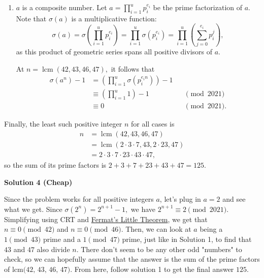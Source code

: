 \begin{enumerate}
\begin{enumerate}
 Together, we conclude that $n=\operatorname{lcm}(42,43,46,47)$ is the least such positive integer $n$ for this case.

 

        \item $a$ is a composite number. Let $a=\prod_{i=1}^{u}p_i^{e_i}$ be the prime factorization of $a.$ Note that $\sigma(a)$ is a multiplicative function: 
 \[\sigma(a)=\sigma\left(\prod_{i=1}^{u}p_i^{e_i}\right)=\prod_{i=1}^{u}\sigma\left(p_i^{e_i}\right)=\prod_{i=1}^{u}\left(\sum_{j=0}^{e_i}p_i^j\right),\] as this product of geometric series spans all positive divisors of $a.$ 

 At $n=\operatorname{lcm}(42,43,46,47),$ it follows that
 \begin{align*} \sigma\left(a^n\right)-1&=\left(\prod_{i=1}^{u}\sigma\left(p_i^{e_in}\right)\right)-1 \\ &\equiv\left(\prod_{i=1}^{u}1\right)-1 &&\pmod{2021} \\ &\equiv0 &&\pmod{2021}. \end{align*}



            \end{enumerate}
            Finally, the least such positive integer $n$ for all cases is
 \begin{align*} n&=\operatorname{lcm}(42,43,46,47) \\ &=\operatorname{lcm}(2\cdot3\cdot7,43,2\cdot23,47) \\ &=2\cdot3\cdot7\cdot23\cdot43\cdot47, \end{align*}
so the sum of its prime factors is $2+3+7+23+43+47=\boxed{125}.$




\textbf{Solution 4 (Cheap)}

Since the problem works for all positive integers $a$, let's plug in $a=2$ and see what we get. Since $\sigma({2^n}) = 2^{n+1}-1,$ we have $2^{n+1} \equiv 2 \pmod{2021}.$ Simplifying using CRT and \href{https://artofproblemsolving.com/wiki/index.php?title=Fermat\%27s\_Little\_Theorem}{Fermat's Little Theorem}, we get that $n \equiv 0 \pmod{42}$ and $n \equiv 0 \pmod{46}.$ Then, we can look at $a$ being a $1\pmod{43}$ prime and a $1\pmod{47}$ prime, just like in Solution 1, to find that $43$ and $47$ also divide $n$. There don't seem to be any other odd "numbers" to check, so we can hopefully assume that the answer is the sum of the prime factors of $\text{lcm(42, 43, 46, 47)}.$ From here, follow solution 1 to get the final answer $\boxed{125}$.


\end{enumerate}
